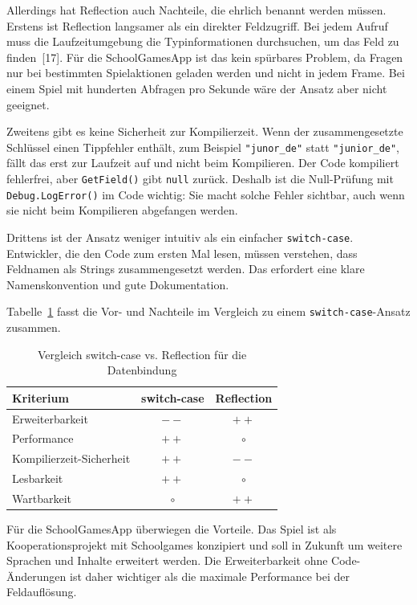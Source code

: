 \documentclass[12pt,a4paper]{article}
\begin{document}
Allerdings hat Reflection auch Nachteile, die ehrlich benannt werden müssen. Erstens ist Reflection langsamer als ein direkter Feldzugriff. Bei jedem Aufruf muss die Laufzeitumgebung die Typinformationen durchsuchen, um das Feld zu finden~[17]. Für die SchoolGamesApp ist das kein spürbares Problem, da Fragen nur bei bestimmten Spielaktionen geladen werden und nicht in jedem Frame. Bei einem Spiel mit hunderten Abfragen pro Sekunde wäre der Ansatz aber nicht geeignet.

Zweitens gibt es keine Sicherheit zur Kompilierzeit. Wenn der zusammengesetzte Schlüssel einen Tippfehler enthält, zum Beispiel \texttt{"junor\_de"} statt \texttt{"junior\_de"}, fällt das erst zur Laufzeit auf und nicht beim Kompilieren. Der Code kompiliert fehlerfrei, aber \texttt{GetField()} gibt \texttt{null} zurück. Deshalb ist die Null-Prüfung mit \texttt{Debug.LogError()} im Code wichtig: Sie macht solche Fehler sichtbar, auch wenn sie nicht beim Kompilieren abgefangen werden.

Drittens ist der Ansatz weniger intuitiv als ein einfacher \texttt{switch-case}. Entwickler, die den Code zum ersten Mal lesen, müssen verstehen, dass Feldnamen als Strings zusammengesetzt werden. Das erfordert eine klare Namenskonvention und gute Dokumentation.

Tabelle~\ref{tab:reflection-vergleich} fasst die Vor- und Nachteile im Vergleich zu einem \texttt{switch-case}-Ansatz zusammen.

\begin{table}[H]
    \centering
    \begin{tabular}{lcc}
        \toprule
        \textbf{Kriterium} & \textbf{switch-case} & \textbf{Reflection} \\
        \midrule
        Erweiterbarkeit     & $--$ & $++$ \\
        Performance         & $++$ & $\circ$ \\
        Kompilierzeit-Sicherheit & $++$ & $--$ \\
        Lesbarkeit          & $++$ & $\circ$ \\
        Wartbarkeit         & $\circ$ & $++$ \\
        \bottomrule
    \end{tabular}
    \caption{Vergleich switch-case vs. Reflection für die Datenbindung}
    \label{tab:reflection-vergleich}
\end{table}

Für die SchoolGamesApp überwiegen die Vorteile. Das Spiel ist als Kooperationsprojekt mit Schoolgames konzipiert und soll in Zukunft um weitere Sprachen und Inhalte erweitert werden. Die Erweiterbarkeit ohne Code-Änderungen ist daher wichtiger als die maximale Performance bei der Feldauflösung.
\end{document}
